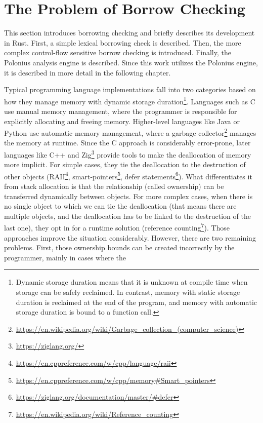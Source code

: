 \documentclass[
  11pt,
  twoside,symmetric]{report}
\DeclareRobustCommand{\href}[2]{#2\footnote{\url{#1}}}
\begin{document}
\chapter{The Problem of Borrow
Checking}\label{the-problem-of-borrow-checking}

This section introduces borrowing checking and briefly describes its
development in Rust. First, a simple lexical borrowing check is
described. Then, the more complex control-flow sensitive borrow checking
is introduced. Finally, the Polonius analysis engine is described. Since
this work utilizes the Polonius engine, it is described in more detail
in the following chapter.

Typical programming language implementations fall into two categories
based on how they manage memory with dynamic storage
duration\footnote{Dynamic storage duration means that it is unknown at
  compile time when storage can be safely reclaimed. In contrast, memory
  with static storage duration is reclaimed at the end of the program,
  and memory with automatic storage duration is bound to a function
  call.}. Languages such as C use manual memory management, where the
programmer is responsible for explicitly allocating and freeing memory.
Higher-level languages like Java or Python use automatic memory
management, where a
\href{https://en.wikipedia.org/wiki/Garbage_collection_(computer_science)}{garbage
collector} manages the memory at runtime. Since the C approach is
considerably error-prone, later languages
like C++ and \href{https://ziglang.org/}{Zig} provide tools to make the
deallocation of memory more implicit. For simple cases, they tie the
deallocation to the destruction of other objects
(\href{https://en.cppreference.com/w/cpp/language/raii}{RAII},
\href{https://en.cppreference.com/w/cpp/memory\#Smart_pointers}{smart-pointers},
\href{https://ziglang.org/documentation/master/\#defer}{defer
statements}). What differentiates it from stack allocation is that the
relationship (called ownership) can be transferred dynamically between
objects. For more complex cases, when there is no single object to which
we can tie the deallocation (that means there are multiple objects, and
the deallocation has to be linked to the destruction of the last one),
they opt in for a runtime solution
(\href{https://en.wikipedia.org/wiki/Reference_counting}{reference
counting}). Those approaches improve the situation considerably.
However, there are two remaining problems. First, those ownership bounds
can be created incorrectly by the programmer, mainly in cases where the
\end{document}
